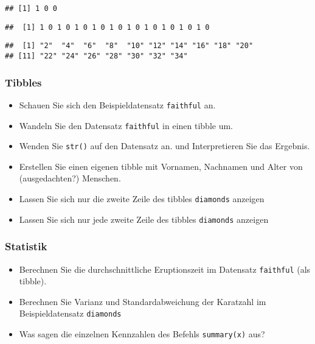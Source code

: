 \documentclass[11pt,german,a4paper]{article}
\providecommand{\tightlist}{%
  \setlength{\itemsep}{0pt}\setlength{\parskip}{0pt}}
\begin{document}
\begin{verbatim}
## [1] 1 0 0
\end{verbatim}

\begin{verbatim}
##  [1] 1 0 1 0 1 0 1 0 1 0 1 0 1 0 1 0 1 0 1 0
\end{verbatim}

\begin{verbatim}
##  [1] "2"  "4"  "6"  "8"  "10" "12" "14" "16" "18" "20"
## [11] "22" "24" "26" "28" "30" "32" "34"
\end{verbatim}

\hypertarget{tibbles-1}{%
\subsubsection{Tibbles}\label{tibbles-1}}

\begin{itemize}
\tightlist
\item
  Schauen Sie sich den Beispieldatensatz \texttt{faithful} an.
\item
  Wandeln Sie den Datensatz \texttt{faithful} in einen tibble um.
\item
  Wenden Sie \texttt{str()} auf den Datensatz an. und Interpretieren Sie das Ergebnis.
\item
  Erstellen Sie einen eigenen tibble mit Vornamen, Nachnamen und Alter von (ausgedachten?) Menschen.
\item
  Lassen Sie sich nur die zweite Zeile des tibbles \texttt{diamonds} anzeigen
\item
  Lassen Sie sich nur jede zweite Zeile des tibbles \texttt{diamonds} anzeigen
\end{itemize}

\hypertarget{statistik}{%
\subsubsection{Statistik}\label{statistik}}

\begin{itemize}
\tightlist
\item
  Berechnen Sie die durchschnittliche Eruptionszeit im Datensatz \texttt{faithful} (als tibble).
\item
  Berechnen Sie Varianz und Standardabweichung der Karatzahl im Beispieldatensatz \texttt{diamonds}
\item
  Was sagen die einzelnen Kennzahlen des Befehls \texttt{summary(x)} aus?
\end{itemize}
\end{document}
